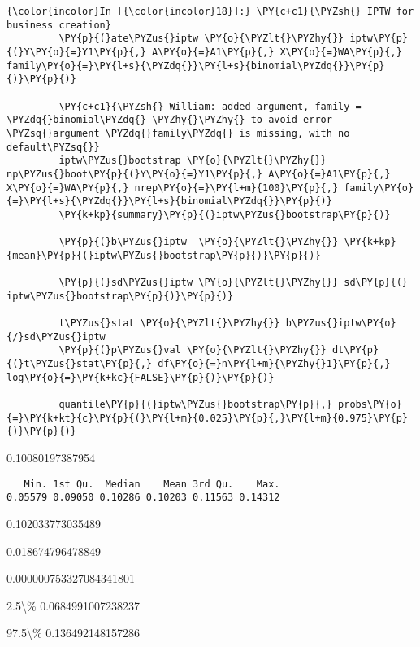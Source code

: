    \begin{Verbatim}[commandchars=\\\{\}]
{\color{incolor}In [{\color{incolor}18}]:} \PY{c+c1}{\PYZsh{} IPTW for business creation}
         \PY{p}{(}ate\PYZus{}iptw \PY{o}{\PYZlt{}\PYZhy{}} iptw\PY{p}{(}Y\PY{o}{=}Y1\PY{p}{,} A\PY{o}{=}A1\PY{p}{,} X\PY{o}{=}WA\PY{p}{,} family\PY{o}{=}\PY{l+s}{\PYZdq{}}\PY{l+s}{binomial\PYZdq{}}\PY{p}{)}\PY{p}{)}
         
         \PY{c+c1}{\PYZsh{} William: added argument, family = \PYZdq{}binomial\PYZdq{} \PYZhy{}\PYZhy{} to avoid error \PYZsq{}argument \PYZdq{}family\PYZdq{} is missing, with no default\PYZsq{}}
         iptw\PYZus{}bootstrap \PY{o}{\PYZlt{}\PYZhy{}} np\PYZus{}boot\PY{p}{(}Y\PY{o}{=}Y1\PY{p}{,} A\PY{o}{=}A1\PY{p}{,} X\PY{o}{=}WA\PY{p}{,} nrep\PY{o}{=}\PY{l+m}{100}\PY{p}{,} family\PY{o}{=}\PY{l+s}{\PYZdq{}}\PY{l+s}{binomial\PYZdq{}}\PY{p}{)} 
         \PY{k+kp}{summary}\PY{p}{(}iptw\PYZus{}bootstrap\PY{p}{)}
         
         \PY{p}{(}b\PYZus{}iptw  \PY{o}{\PYZlt{}\PYZhy{}} \PY{k+kp}{mean}\PY{p}{(}iptw\PYZus{}bootstrap\PY{p}{)}\PY{p}{)}
         
         \PY{p}{(}sd\PYZus{}iptw \PY{o}{\PYZlt{}\PYZhy{}} sd\PY{p}{(}  iptw\PYZus{}bootstrap\PY{p}{)}\PY{p}{)}
         
         t\PYZus{}stat \PY{o}{\PYZlt{}\PYZhy{}} b\PYZus{}iptw\PY{o}{/}sd\PYZus{}iptw
         \PY{p}{(}p\PYZus{}val \PY{o}{\PYZlt{}\PYZhy{}} dt\PY{p}{(}t\PYZus{}stat\PY{p}{,} df\PY{o}{=}n\PY{l+m}{\PYZhy{}1}\PY{p}{,} log\PY{o}{=}\PY{k+kc}{FALSE}\PY{p}{)}\PY{p}{)}
         
         quantile\PY{p}{(}iptw\PYZus{}bootstrap\PY{p}{,} probs\PY{o}{=}\PY{k+kt}{c}\PY{p}{(}\PY{l+m}{0.025}\PY{p}{,}\PY{l+m}{0.975}\PY{p}{)}\PY{p}{)}
\end{Verbatim}


    0.10080197387954

    
    
    \begin{verbatim}
   Min. 1st Qu.  Median    Mean 3rd Qu.    Max. 
0.05579 0.09050 0.10286 0.10203 0.11563 0.14312 
    \end{verbatim}

    
    0.102033773035489

    
    0.018674796478849

    
    0.000000753327084341801

    
    \begin{description*}
\item[2.5\textbackslash{}\%] 0.0684991007238237
\item[97.5\textbackslash{}\%] 0.136492148157286
\end{description*}

